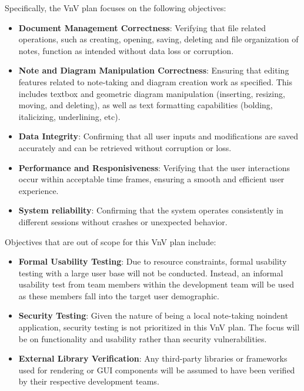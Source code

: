 \documentclass[12pt, titlepage]{article}
\begin{document}
\noindent Specifically, the VnV plan focuses on the following objectives:
\begin{itemize}
  \item \textbf{Document Management Correctness}: Verifying that file related operations,
  such as creating, opening, saving, deleting and file organization of notes, 
  function as intended without data loss or corruption.
  \item \textbf{Note and Diagram Manipulation Correctness}: Ensuring that editing features
  related to note-taking and diagram creation work as specified. This includes
  textbox and geometric diagram manipulation (inserting, resizing, moving, and 
  deleting), as well as text formatting capabilities (bolding, italicizing,
  underlining, etc).
  \item \textbf{Data Integrity}: Confirming that all user inputs and modifications are saved
  accurately and can be retrieved without corruption or loss.
  \item \textbf{Performance and Responisiveness}: Verifying that the user interactions occur 
  within acceptable time frames, ensuring a smooth and efficient user experience.
  \item \textbf{System reliability}: Confirming that the system operates consistently in
  different sessions without crashes or unexpected behavior.

\end{itemize}
\vspace{1em}

\noindent Objectives that are out of scope for this VnV plan include:
\begin{itemize}
  \item \textbf{Formal Usability Testing}: Due to resource constraints, formal usability testing
  with a large user base will not be conducted. Instead, an informal usability test from 
  team members within the development team will be used as these members fall into
  the target user demographic.
  \item \textbf{Security Testing}: Given the nature of \progname{} being a local note-taking
noindent  application, security testing is not prioritized in this VnV plan. The focus
  will be on functionality and usability rather than security vulnerabilities.
  \item \textbf{External Library Verification}: Any third-party libraries or frameworks used
  for rendering or GUI components will be assumed to have been verified by their
  respective development teams. 
\end{itemize}  
\end{document}

